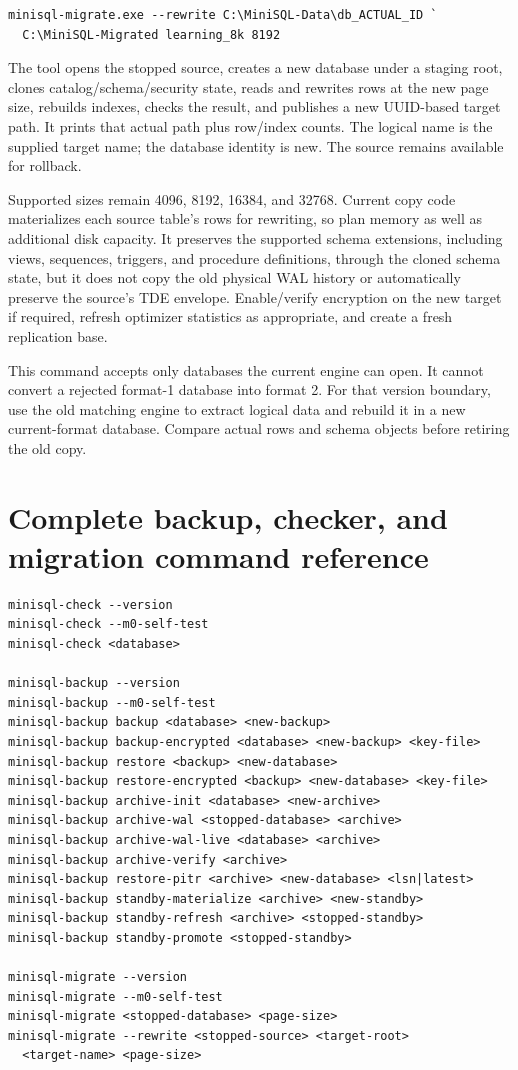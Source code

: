\begin{lstlisting}
minisql-migrate.exe --rewrite C:\MiniSQL-Data\db_ACTUAL_ID `
  C:\MiniSQL-Migrated learning_8k 8192
\end{lstlisting}

The tool opens the stopped source, creates a new database under a staging
root, clones catalog/schema/security state, reads and rewrites rows at the
new page size, rebuilds indexes, checks the result, and publishes a new
UUID-based target path. It prints that actual path plus row/index counts.
The logical name is the supplied target name; the database identity is new.
The source remains available for rollback.

Supported sizes remain 4096, 8192, 16384, and 32768. Current copy code
materializes each source table's rows for rewriting, so plan memory as well
as additional disk capacity. It preserves the supported schema extensions,
including views, sequences, triggers, and procedure definitions, through the
cloned schema state, but it does not copy the old physical WAL history or
automatically preserve the source's TDE envelope. Enable/verify encryption
on the new target if required, refresh optimizer statistics as appropriate,
and create a fresh replication base.

This command accepts only databases the current engine can open. It cannot
convert a rejected format-1 database into format 2. For that version boundary,
use the old matching engine to extract logical data and rebuild it in a new
current-format database. Compare actual rows and schema objects before
retiring the old copy.


\section{Complete backup, checker, and migration command reference}

\begin{lstlisting}
minisql-check --version
minisql-check --m0-self-test
minisql-check <database>

minisql-backup --version
minisql-backup --m0-self-test
minisql-backup backup <database> <new-backup>
minisql-backup backup-encrypted <database> <new-backup> <key-file>
minisql-backup restore <backup> <new-database>
minisql-backup restore-encrypted <backup> <new-database> <key-file>
minisql-backup archive-init <database> <new-archive>
minisql-backup archive-wal <stopped-database> <archive>
minisql-backup archive-wal-live <database> <archive>
minisql-backup archive-verify <archive>
minisql-backup restore-pitr <archive> <new-database> <lsn|latest>
minisql-backup standby-materialize <archive> <new-standby>
minisql-backup standby-refresh <archive> <stopped-standby>
minisql-backup standby-promote <stopped-standby>

minisql-migrate --version
minisql-migrate --m0-self-test
minisql-migrate <stopped-database> <page-size>
minisql-migrate --rewrite <stopped-source> <target-root>
  <target-name> <page-size>
\end{lstlisting}


